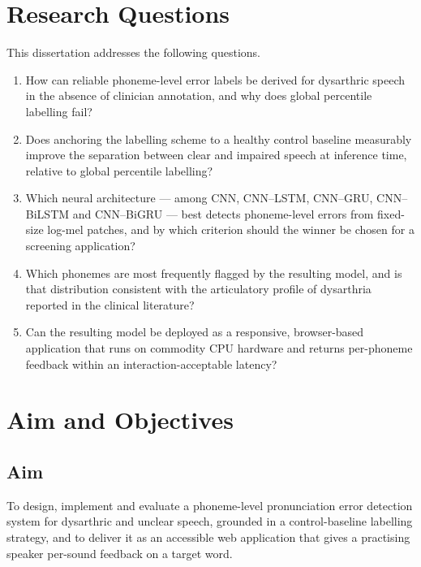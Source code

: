 \section{Research Questions}
\label{sec:research-questions}

This dissertation addresses the following questions.

\begin{enumerate}[label=\textbf{RQ\arabic*.},leftmargin=1.6cm]
  \item How can reliable phoneme-level error labels be derived for dysarthric
        speech in the absence of clinician annotation, and why does global
        percentile labelling fail?
  \item Does anchoring the labelling scheme to a healthy control baseline
        measurably improve the separation between clear and impaired speech at
        inference time, relative to global percentile labelling?
  \item Which neural architecture --- among CNN, CNN--LSTM, CNN--GRU,
        CNN--BiLSTM and CNN--BiGRU --- best detects phoneme-level errors from
        fixed-size log-mel patches, and by which criterion should the winner be
        chosen for a screening application?
  \item Which phonemes are most frequently flagged by the resulting model, and
        is that distribution consistent with the articulatory profile of
        dysarthria reported in the clinical literature?
  \item Can the resulting model be deployed as a responsive, browser-based
        application that runs on commodity CPU hardware and returns
        per-phoneme feedback within an interaction-acceptable latency?
\end{enumerate}

\section{Aim and Objectives}
\label{sec:aim-objectives}

\subsection{Aim}

To design, implement and evaluate a phoneme-level pronunciation error detection
system for dysarthric and unclear speech, grounded in a control-baseline
labelling strategy, and to deliver it as an accessible web application that
gives a practising speaker per-sound feedback on a target word.

